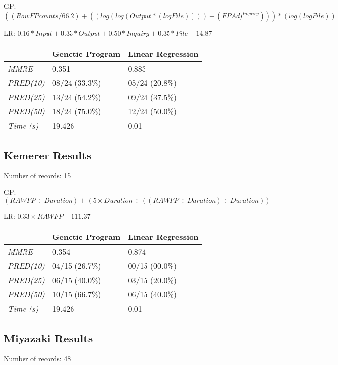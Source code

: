 \documentclass[11pt, a4paper]{article}
\begin{document}
GP:
\(((RawFPcounts / 66.2) + ((log (log (Output * (log File)))) +
(FPAdj ^ {Inquiry}))) * (log (log File))\)

LR:
\(0.16 * Input + 0.33 * Output + 0.50 * Inquiry + 0.35 * File - 14.87\)

\begin{tabularx}{\textwidth}{| l | X | X |}
\hline
 & \textbf{Genetic Program} & \textbf{Linear Regression} \\
\hline
\emph{MMRE} & 0.351 & 0.883 \\
\hline
\emph{PRED(10)} & 08/24 (33.3\%) & 05/24 (20.8\%) \\
\emph{PRED(25)} & 13/24 (54.2\%) & 09/24 (37.5\%) \\
\emph{PRED(50)} & 18/24 (75.0\%) & 12/24 (50.0\%) \\
\hline
\emph{Time (s)} & 19.426 & 0.01 \\
\hline
\end{tabularx}

\subsection{Kemerer Results} %
\label{sub:kemerer_results}
Number of records: 15

GP: \((RAWFP \div Duration) + (5 \times Duration \div ((RAWFP \div Duration)
\div Duration))\)

LR: \(0.33 \times RAWFP - 111.37\)

\begin{tabularx}{\textwidth}{| l | X | X |}
\hline
 & \textbf{Genetic Program} & \textbf{Linear Regression} \\
\hline
\emph{MMRE} & 0.354 & 0.874 \\
\hline
\emph{PRED(10)} & 04/15 (26.7\%) & 00/15 (00.0\%) \\
\emph{PRED(25)} & 06/15 (40.0\%) & 03/15 (20.0\%) \\
\emph{PRED(50)} & 10/15 (66.7\%) & 06/15 (40.0\%) \\
\hline
\emph{Time (s)} & 19.426 & 0.01 \\
\hline
\end{tabularx}

\subsection{Miyazaki Results} %
\label{sub:miyazaki_results}
Number of records: 48
\end{document}
